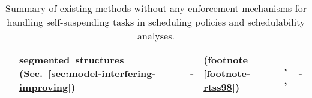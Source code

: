 \begin{table}[h!]
{\begin{tabular}{||C{0.5cm}|C{3.3cm}||C{3cm}|C{3cm}|C{3cm}|C{3.8cm}|}
& segmented~structures (Sec.~\ref{sec:model-interfering-improving}) &
- & \cite{PH:rtss98} (footnote \ref{footnote-rtss98}) & \cite{RTCSA-BletsasA05}, \cite[Chapter 5.4]{bletsas:thesis}, \cite{Huang:multiseg} & -\\
\hline
\end{tabular}
}
  \caption{Summary of existing methods without any enforcement
    mechanisms for handling self-suspending tasks in scheduling
    policies and schedulability analyses. } 
  \label{tab:summary-methods}
\end{table}


